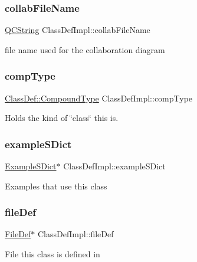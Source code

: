 \subsubsection{\texorpdfstring{collabFileName}{collabFileName}}
{\footnotesize\ttfamily \mbox{\hyperlink{class_q_c_string}{Q\+C\+String}} Class\+Def\+Impl\+::collab\+File\+Name}

file name used for the collaboration diagram \mbox{\label{class_class_def_impl_af8b4e7fb963b0feff4a8009a358bd90b}} 
\subsubsection{\texorpdfstring{compType}{compType}}
{\footnotesize\ttfamily \mbox{\hyperlink{class_class_def_ae70cf86d35fe954a94c566fbcfc87939}{Class\+Def\+::\+Compound\+Type}} Class\+Def\+Impl\+::comp\+Type}

Holds the kind of \char`\"{}class\char`\"{} this is. \mbox{\label{class_class_def_impl_a256b7b66998ac4aaf0495a4133fa16a3}} 
\subsubsection{\texorpdfstring{exampleSDict}{exampleSDict}}
{\footnotesize\ttfamily \mbox{\hyperlink{class_example_s_dict}{Example\+S\+Dict}}$\ast$ Class\+Def\+Impl\+::example\+S\+Dict}

Examples that use this class \mbox{\label{class_class_def_impl_ac2c8c9c6cc2cea9076ad649149505f1a}} 
\subsubsection{\texorpdfstring{fileDef}{fileDef}}
{\footnotesize\ttfamily \mbox{\hyperlink{class_file_def}{File\+Def}}$\ast$ Class\+Def\+Impl\+::file\+Def}

File this class is defined in \mbox{\label{class_class_def_impl_af4852c18aa3acaa24dd3056896a51605}} 
